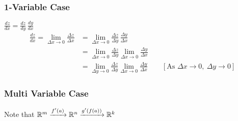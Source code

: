 \begin{myproof}
	\subsubsection{1-Variable Case}
	$\frac{dz}{dx}=\frac{dz}{dy}\, \frac{dy}{dx}$\begin{align*}
		\frac{dz}{dx} =\lim_{\Delta x\to 0} \frac{\Delta z}{\Delta x} &=\lim_{\Delta x\to 0}\frac{\Delta z}{\Delta y}\, \frac{\Delta y}{\Delta x}\\
		& =\lim_{\Delta x\to 0}\frac{\Delta z}{\Delta y}\lim_{\Delta x\to 0} \frac{\Delta y}{\Delta x}\\
		& =\lim_{\Delta y\to 0}\frac{\Delta z}{\Delta y}\lim_{\Delta x\to 0} \frac{\Delta y}{\Delta x}\qquad [\text{As }\Delta x\to0,\ \Delta y\to 0]
	\end{align*}
\subsubsection{Multi Variable Case}
Note that $\mathbb{R}^m\xrightarrow{f'(a)}\mathbb{R}^n\xrightarrow{g'(f(a))}\mathbb{R}^k$


\end{myproof}
